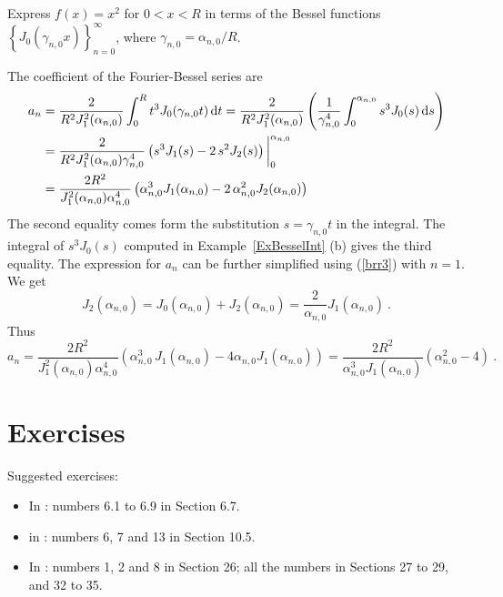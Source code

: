 \begin{egg}
Express $\displaystyle f(x) = x^2$ for $0<x<R$ in terms of the Bessel functions
$\displaystyle \left\{ J_0(\gamma_{n,0}x)\right\}_{n=0}^\infty$, where
$\gamma_{n,0} = \alpha_{n,0}/R$.

The coefficient of the Fourier-Bessel series are
\begin{align*}
a_n &= \frac{2}{R^2 J_{1}^2(\alpha_{n,0})} \int_0^R
t^3J_0(\gamma_{n,0} t) \,\mathrm{d}{t}
= \frac{2}{R^2 J_{1}^2(\alpha_{n,0})} \left( \frac{1}{\gamma_{n,0}^4}
\int_0^{\alpha_{n,0}} s^3 J_0(s) \,\mathrm{d}{s} \right) \\
&= \frac{2}{R^2 J_{1}^2(\alpha_{n,0})\gamma_{n,0}^4}
\left( s^3 J_1(s) - 2\, s^2 J_2(s) \right)\bigg|_0^{\alpha_{n,0}} \\ 
&= \frac{2 R^2}{J_{1}^2(\alpha_{n,0})\alpha_{n,0}^4}
\left( \alpha_{n,0}^3 J_1(\alpha_{n,0})
- 2\, \alpha_{n,0}^2 J_2(\alpha_{n,0}) \right)
\end{align*}
The second equality comes form the substitution $s=\gamma_{n,0}t$ in
the integral.  The integral of $s^3J_0(s)$ computed in
Example~\ref{ExBesselInt} (b) gives the third equality.  The
expression for $a_n$ can be further simplified using (\ref{brr3}) with
$n=1$.  We get
\[
  J_2(\alpha_{n,0}) = J_0(\alpha_{n,0}) + J_2(\alpha_{n,0})
  = \frac{2}{\alpha_{n,0}} J_1(\alpha_{n,0}) \ .
\]
Thus
\[
  a_n = \frac{2 R^2}{J_{1}^2(\alpha_{n,0})\alpha_{n,0}^4}
\left( \alpha_{n,0}^3 \, J_1(\alpha_{n,0})
  - 4 \alpha_{n,0} J_1(\alpha_{n,0}) \right)
= \frac{2R^2}{\alpha_{n,0}^3 J_{1}(\alpha_{n,0})} \left(
\alpha_{n,0}^2 - 4\right) \ . 
\]
\end{egg}

\section{Exercises}

Suggested exercises:

\begin{itemize}
\item In \cite{PinRub}: numbers 6.1 to 6.9 in Section 6.7.
\item in \cite{Str}: numbers 6, 7 and 13 in Section 10.5.
\item In \cite{Simm}: numbers 1, 2 and 8 in Section 26; all the numbers in
Sections 27 to 29, and 32 to 35.
\end{itemize}

